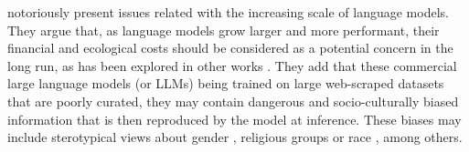 \citet{parrots_bender} notoriously present issues related with the increasing scale of language models. They argue that, as language models grow larger and more performant, their financial and ecological costs should be considered as a potential concern in the long run, as has been explored in other works \citep{su14095172, rillig_2023}. They add that these commercial large language models (or LLMs) being trained on large web-scraped datasets that are poorly curated, they may contain dangerous and socio-culturally biased information that is then reproduced by the model at inference. These biases may include sterotypical views about gender \citep{kotek2023gender}, religious groups \citep{10.1145/3461702.3462624} or race \citep{nadeem-etal-2021-stereoset}, among others.

\newpage




